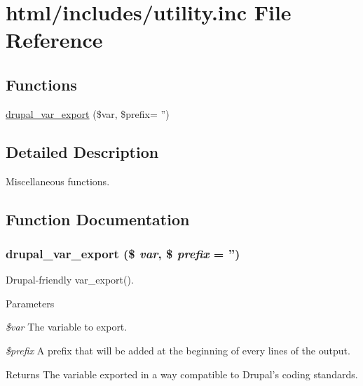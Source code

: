 \hypertarget{includes_2utility_8inc}{
\section{html/includes/utility.inc File Reference}
\label{includes_2utility_8inc}
}
\subsection*{Functions}
\begin{DoxyCompactItemize}
\item 
\hyperlink{includes_2utility_8inc_a8870f2714b1a4c37d23108863e03daa9}{drupal\_\-var\_\-export} (\$var, \$prefix= '')
\end{DoxyCompactItemize}


\subsection{Detailed Description}
Miscellaneous functions. 

\subsection{Function Documentation}
\hypertarget{includes_2utility_8inc_a8870f2714b1a4c37d23108863e03daa9}{
\subsubsection[{drupal\_\-var\_\-export}]{\setlength{\rightskip}{0pt plus 5cm}drupal\_\-var\_\-export (\$ {\em var}, \/  \$ {\em prefix} = {\ttfamily ''})}}
\label{includes_2utility_8inc_a8870f2714b1a4c37d23108863e03daa9}
Drupal-\/friendly var\_\-export().


\begin{DoxyParams}{Parameters}
\item[{\em \$var}]The variable to export. \item[{\em \$prefix}]A prefix that will be added at the beginning of every lines of the output.\end{DoxyParams}
\begin{DoxyReturn}{Returns}
The variable exported in a way compatible to Drupal's coding standards. 
\end{DoxyReturn}
